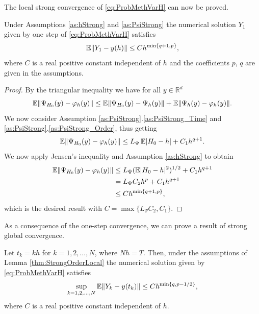 \documentclass{siamart1116}
\numberwithin{theorem}{section}
\DeclarePairedDelimiter{\abs}{\lvert}{\rvert}
\DeclarePairedDelimiter{\norm}{\|}{\|}
\renewcommand{\phi}{\varphi}
\newcommand{\R}{\mathbb{R}}
\newcommand{\E}{\operatorname{\mathbb{E}}}
\begin{document}
The local strong convergence of \eqref{eq:ProbMethVarH} can now be proved. 
\begin{lemma}\label{thm:StrongOrderLocal} Under Assumptions \ref{as:hStrong} and \ref{as:PsiStrong} the numerical solution $Y_1$ given by one step of \eqref{eq:ProbMethVarH} satisfies 
	\begin{equation}
	\E\norm{Y_1 - y(h)} \leq C h^{\min\{q + 1, p\}},
	\end{equation}
	where $C$ is a real positive constant independent of $h$ and the coefficients $p$, $q$ are given in the assumptions.
\end{lemma}
\begin{proof} By the triangular inequality we have for all $y \in \R^d$ 
	\begin{equation}
		\E\norm{\Psi_{H_0}(y) - \phi_h(y)} \leq \E\norm{\Psi_{H_0}(y) - \Psi_h(y)} + \E\norm{\Psi_h(y) - \phi_h(y)}.
	\end{equation}		
	We now consider Assumption \ref{as:PsiStrong}.\ref{as:PsiStrong_Time} and \ref{as:PsiStrong}.\ref{as:PsiStrong_Order}, thus getting
	\begin{equation}\label{eq:LocalErrorDecomposition}
		\E\norm{\Psi_{H_0}(y) - \phi_h(y)} \leq L_{\Psi} \E\abs{H_0 - h} + C_1 h^{q+1}.
	\end{equation}
	We now apply Jensen's inequality and Assumption \ref{as:hStrong} to obtain
	\begin{equation}
	\begin{aligned}
		\E\norm{\Psi_{H_0}(y) - \phi_h(y)} & \leq L_{\Psi} (\E\abs{H_0 - h}^{2})^{1/2} + C_1 h^{q+1}\\
		&= L_{\Psi}C_2 h^p + C_1 h^{q+1} \\
		&\leq C h^{\min\{q+1, p\}},
	\end{aligned}
	\end{equation}
	which is the desired result with $C = \max\{L_\Psi C_2, C_1\}$.
\end{proof}
As a consequence of the one-step convergence, we can prove a result of strong global convergence.
\begin{theorem}\label{thm:StrongOrder} Let $t_k = kh$ for $k = 1, 2, \ldots, N$, where $Nh = T$. Then, under the assumptions of Lemma \ref{thm:StrongOrderLocal} the numerical solution given by \eqref{eq:ProbMethVarH} satisfies 
	\begin{equation}\label{eq:StrongGlobalClaim}
		\sup_{k=1,2, \ldots, N} \E\norm{Y_k - y(t_k)} \leq C h^{\min\{q, p-1/2\}},
	\end{equation}
	where $C$ is a real positive constant independent of $h$. 
\end{theorem}
\end{document}
